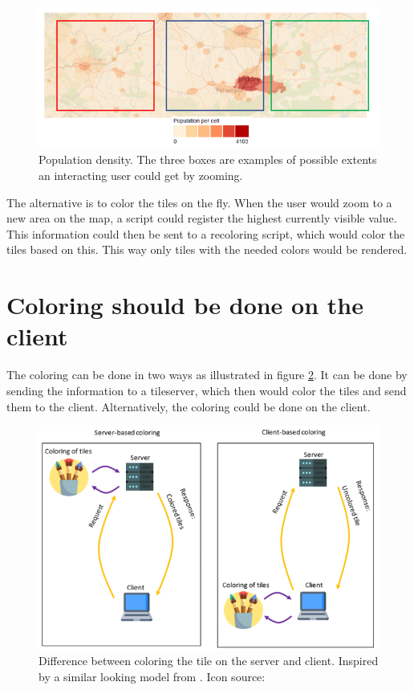 \begin{figure} [H]
	\centering
	\includegraphics[width=.8\textwidth]{Pictures/WhyNotPrecolor}
	\caption{Population density. The three boxes are examples of possible extents an interacting user could get by zooming.}
	\label{WhyNotPrecolor}
\end{figure}

The alternative is to color the tiles on the fly. When the user would zoom to a new area on the map, a script could register the highest currently visible value. This information could then be sent to a recoloring script, which would color the tiles based on this. This way only tiles with the needed colors would be rendered. 


\section{Coloring should be done on the client}
The coloring can be done in two ways as illustrated in figure \ref{WhyColorLocally}. It can be done by sending the information to a tileserver, which then would color the tiles and send them to the client. Alternatively, the coloring could be done on the client. 

\begin{figure} [H]
	\centering
	\includegraphics[width=.8\textwidth]{Pictures/WhyColorLocally}
	\caption{Difference between coloring the tile on the server and client. Inspired by a similar looking model from \citet{Baumrocks}. Icon source: \citep{Freepik}}
	\label{WhyColorLocally}
\end{figure}

